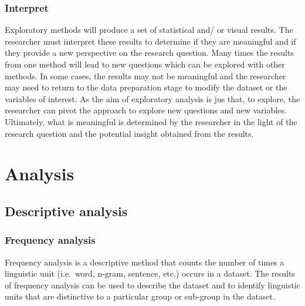 \documentclass[
  letterpaper,
]{latex/krantz}
\begin{document}
\hypertarget{eda-interpret}{%
\subsubsection{Interpret}\label{eda-interpret}}

Exploratory methods will produce a set of statistical and/ or visual
results. The researcher must interpret these results to determine if
they are meaningful and if they provide a new perspective on the
research question. Many times the results from one method will lead to
new questions which can be explored with other methods. In some cases,
the results may not be meaningful and the researcher may need to return
to the data preparation stage to modify the dataset or the variables of
interest. As the aim of exploratory analysis is jus that, to explore,
the researcher can pivot the approach to explore new questions and new
variables. Ultimately, what is meaningful is determined by the
researcher in the light of the research question and the potential
insight obtained from the results.

\hypertarget{eda-analysis}{%
\section{Analysis}\label{eda-analysis}}

\hypertarget{eda-descriptive}{%
\subsection{Descriptive analysis}\label{eda-descriptive}}

\hypertarget{eda-frequency}{%
\subsubsection{Frequency analysis}\label{eda-frequency}}

Frequency analysis is a descriptive method that counts the number of
times a linguistic unit (i.e.~word, n-gram, sentence, etc.) occurs in a
dataset. The results of frequency analysis can be used to describe the
dataset and to identify linguistic units that are distinctive to a
particular group or sub-group in the dataset.
\end{document}
